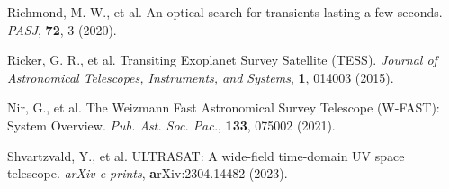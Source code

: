 \documentclass{nature_plusfigure}
\newcommand{\aap}{{Astron. Astrophys.}}
\newcommand{\pasj}{{PASJ}}
\newcommand{\pasp}{{Pub. Ast. Soc. Pac.}}
\newcommand{\araa}{Annual Review of Astronomy and Astrophysics}
\begin{document}
\begin{thebibliography}{100}
 Richmond, M. W., et al. An optical search for transients lasting a few seconds. \emph{\pasj}, \textbf{72}, 3 (2020). 



  Ricker, G. R., et al. Transiting Exoplanet Survey Satellite (TESS). \emph{Journal of Astronomical Telescopes, Instruments, and Systems}, \textbf{1}, 014003 (2015). 

  Nir, G., et al. The Weizmann Fast Astronomical Survey Telescope (W-FAST): System Overview. \emph{\pasp}, \textbf{133}, 075002 (2021). 

 Shvartzvald, Y., et al. ULTRASAT: A wide-field time-domain UV space telescope. \emph{arXiv e-prints}, \textbf arXiv:2304.14482 (2023).  



%
%
%


\end{thebibliography}
\end{document}
